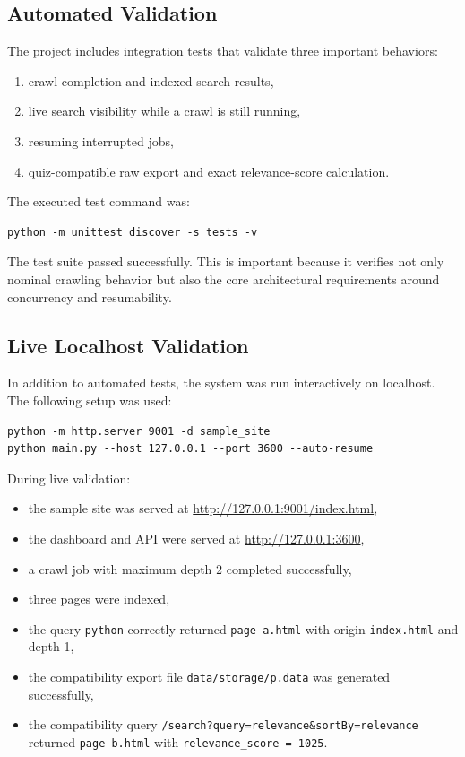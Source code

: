 \documentclass[pdftex,12pt,a4paper]{article}
\begin{document}
\subsection{Automated Validation}

The project includes integration tests that validate three important behaviors:

\begin{enumerate}
    \item crawl completion and indexed search results,
    \item live search visibility while a crawl is still running,
    \item resuming interrupted jobs,
    \item quiz-compatible raw export and exact relevance-score calculation.
\end{enumerate}

The executed test command was:

\begin{Verbatim}[fontsize=\small]
python -m unittest discover -s tests -v
\end{Verbatim}

The test suite passed successfully. This is important because it verifies not only nominal crawling behavior but also the core architectural requirements around concurrency and resumability.

\subsection{Live Localhost Validation}

In addition to automated tests, the system was run interactively on localhost. The following setup was used:

\begin{Verbatim}[fontsize=\small]
python -m http.server 9001 -d sample_site
python main.py --host 127.0.0.1 --port 3600 --auto-resume
\end{Verbatim}

During live validation:

\begin{itemize}
    \item the sample site was served at \url{http://127.0.0.1:9001/index.html},
    \item the dashboard and API were served at \url{http://127.0.0.1:3600},
    \item a crawl job with maximum depth 2 completed successfully,
    \item three pages were indexed,
    \item the query \texttt{python} correctly returned \texttt{page-a.html} with origin \texttt{index.html} and depth 1,
    \item the compatibility export file \texttt{data/storage/p.data} was generated successfully,
    \item the compatibility query \texttt{/search?query=relevance\&sortBy=relevance} returned \texttt{page-b.html} with \texttt{relevance\_score = 1025}.
\end{itemize}
\end{document}
